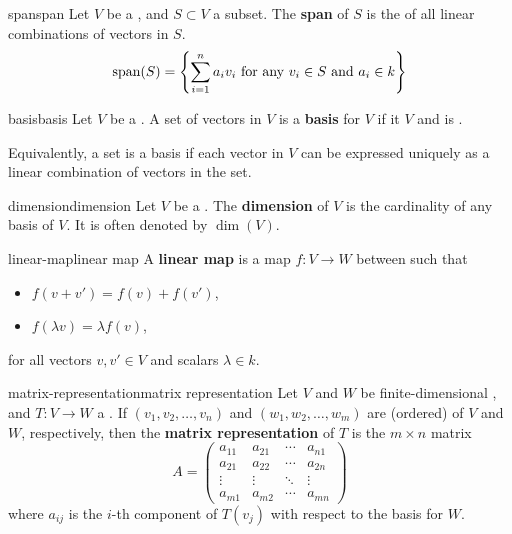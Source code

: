\begin{topic}{span}{span}
    Let $V$ be a , and $S \subset V$ a subset. The \textbf{span} of $S$ is the  of all linear combinations of vectors in $S$.
    \[ \textup{span}(S) = \left\{ \sum_{i = 1}^{n} a_i v_i \textup{ for any } v_i \in S \textup{ and } a_i \in k \right\} \]
\end{topic}

\begin{topic}{basis}{basis}
    Let $V$ be a . A set of vectors in $V$ is a \textbf{basis} for $V$ if it  $V$ and is .
    
    Equivalently, a set is a basis if each vector in $V$ can be expressed uniquely as a linear combination of vectors in the set.
\end{topic}

\begin{topic}{dimension}{dimension}
    Let $V$ be a . The \textbf{dimension} of $V$ is the cardinality of any basis of $V$. It is often denoted by $\dim(V)$.
\end{topic}

\begin{topic}{linear-map}{linear map}
    A \textbf{linear map} is a map $f : V \to W$ between  such that
    \begin{itemize}
        \item $f(v + v') = f(v) + f(v')$,
        \item $f(\lambda v) = \lambda f(v)$,
    \end{itemize}
    for all vectors $v, v' \in V$ and scalars $\lambda \in k$.
\end{topic}

\begin{topic}{matrix-representation}{matrix representation}
    Let $V$ and $W$ be finite-dimensional , and $T : V \to W$ a . If $(v_1, v_2, \ldots, v_n)$ and $(w_1, w_2, \ldots, w_m)$ are (ordered)  of $V$ and $W$, respectively, then the \textbf{matrix representation} of $T$ is the $m \times n$ matrix
    \[ A = \begin{pmatrix} a_{11} & a_{21} & \cdots & a_{n1} \\ a_{21} & a_{22} & \cdots & a_{2n} \\ \vdots & \vdots & \ddots & \vdots \\ a_{m1} & a_{m2} & \cdots & a_{mn} \end{pmatrix} \]
    where $a_{ij}$ is the $i$-th component of $T(v_j)$ with respect to the basis for $W$.
\end{topic}

